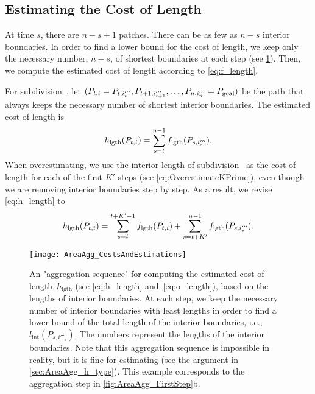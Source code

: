\subsection{Estimating the Cost of Length}
\label{sec:AreaAgg_h_length}

At time $s$, there are $n-s+1$ patches.
There can be as few as $n-s$ interior boundaries.
In order to find a lower bound for the cost of length,
we keep only the necessary number, $n-s$, 
of shortest boundaries at each step
(see \fig\ref{fig:AreaAgg_h_length}).
Then, we compute the estimated cost of length according to 
\eq\ref{eq:f_length}.

For subdivision~\Pnode, let
$(P_{t,i}=P_{t,i'''_t}, P_{t+1,i'''_{t+1}}, 
\dots,P_{n,i'''_n}=P_\mathrm{goal})$
be the path that always keeps 
the necessary number of shortest interior boundaries.
The estimated cost of length is
\begin{equation}
\label{eq:h_length}
h_\mathrm{lgth}(P_{t,i})=
\sum_{s=t}^{n-1}f_\mathrm{lgth}(P_{s,i'''_s}).
\end{equation}
When overestimating,
we use the interior length of subdivision~\Pnode
as the cost of length for each of the first $K'$ steps 
(see \eq\ref{eq:OverestimateKPrime}),
even though we are removing interior boundaries
step by step.
As a result, we revise \fo\ref{eq:h_length} to
\begin{equation}
\label{eq:o_length}
h_\mathrm{lgth}(P_{t,i})=
\sum_{s=t}^{t+K'-1}f_\mathrm{lgth}(P_{t,i})+
\sum_{s=t+K'}^{n-1}f_\mathrm{lgth}(P_{s,i'''_s}).
\end{equation}


\begin{figure*}[htb]
\centering
\texttt{[image: AreaAgg\_CostsAndEstimations]}
\caption{An "aggregation sequence" for computing 
	the estimated cost of length~$h_\mathrm{lgth}$ 
	(see \eqs\ref{eq:h_length} and~\ref{eq:o_length}),
	based on the lengths of interior boundaries. 
	At each step, we keep the necessary number 
	of interior boundaries with least lengths in order to find a 
	lower bound of the total length of the interior boundaries, 
	i.e., $l_\mathrm{int}(P_{s,i'''_s})$.
	The numbers represent the 
	lengths of the interior boundaries.
    Note that this aggregation sequence is impossible in reality,
    but it is fine for estimating
    (see the argument in \sect\ref{sec:AreaAgg_h_type}).    
	This example corresponds to the aggregation step in 
	\fig\ref{fig:AreaAgg_FirstStep}b.
}
\label{fig:AreaAgg_h_length}
\end{figure*}



